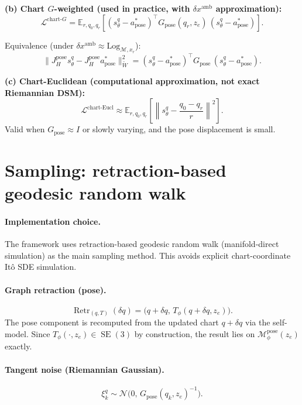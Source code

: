 \documentclass[11pt,a4paper]{article}
\DeclareMathOperator{\Retr}{Retr}
\DeclareMathOperator{\SE}{SE}
\newcommand{\E}{\mathbb{E}}
\newcommand{\N}{\mathcal{N}}
\newcommand{\Loss}{\mathcal{L}}
\newcommand{\Mset}{\mathcal{M}}
\newcommand{\Mpose}{\mathcal{M}_\phi^{\text{pose}}}
\newcommand{\Tphi}{T_\phi}
\begin{document}
\textbf{(b) Chart $G$-weighted (used in practice, with $\delta x^{\text{amb}}$ approximation):}
\begin{equation}
\Loss^{\text{chart-}G} = \E_{r, q_0, q_r} \left[ (s_\theta^q - a^*_{\text{pose}})^\top G_{\text{pose}}(q_r, z_e) \, (s_\theta^q - a^*_{\text{pose}}) \right].
\end{equation}

Equivalence (under $\delta x^{\text{amb}} \approx \mathrm{Log}_{\Mset, x_r}$):
\begin{equation}
\| J_H^{\text{pose}} s_\theta^q - J_H^{\text{pose}} a^*_{\text{pose}} \|^2_{\widetilde W} = (s_\theta^q - a^*_{\text{pose}})^\top G_{\text{pose}} \, (s_\theta^q - a^*_{\text{pose}}).
\end{equation}

\textbf{(c) Chart-Euclidean (computational approximation, not exact Riemannian DSM):}
\begin{equation}
\Loss^{\text{chart-Eucl}} \approx \E_{r, q_0, q_r} \left[ \left\| s_\theta^q - \frac{q_0 - q_r}{r} \right\|^2 \right].
\end{equation}
Valid when $G_{\text{pose}} \approx I$ or slowly varying, and the pose displacement is small.

\section{Sampling: retraction-based geodesic random walk}
\label{sec:sampling}

\paragraph{Implementation choice.} The framework uses retraction-based geodesic random walk (manifold-direct simulation) as the main sampling method. This avoids explicit chart-coordinate It\^o SDE simulation.

\paragraph{Graph retraction (pose).}
\begin{equation}
\Retr_{(q, T)}(\delta q) = \bigl( q + \delta q, \, \Tphi(q + \delta q, z_e) \bigr).
\end{equation}
The pose component is recomputed from the updated chart $q + \delta q$ via the self-model. Since $\Tphi(\cdot, z_e) \in \SE(3)$ by construction, the result lies on $\Mpose(z_e)$ exactly.

\paragraph{Tangent noise (Riemannian Gaussian).}
\begin{equation}
\xi_k^q \sim \N\bigl(0, \, G_{\text{pose}}(q_k, z_e)^{-1}\bigr).
\end{equation}
\end{document}

